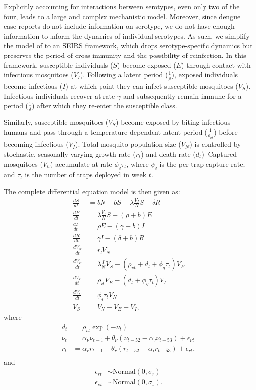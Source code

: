 \documentclass[10pt,letterpaper]{article}
\begin{document}
Explicitly accounting for interactions between serotypes, even only two of the four, leads to a large and complex mechanistic model.
Moreover, since dengue case reports do not include information on serotype, we do not have enough information to inform the dynamics of individual serotypes.
As such, we simplify the model of \cite{Wearing2006} to an SEIRS framework, which drops serotype-specific dynamics but preserves the period of cross-immunity and the possibility of reinfection.
In this framework, susceptible individuals ($S$) become exposed ($E$) through contact with infectious mosquitoes ($V_I$).
Following a latent period ($\frac{1}{\rho}$), exposed individuals become infectious ($I$) at which point they can infect susceptible mosquitoes ($V_S$).
Infectious individuals recover at rate $\gamma$ and subsequently remain immune for a period ($\frac{1}{\delta}$) after which they re-enter the susceptible class.

Similarly, susceptible mosquitoes ($V_S$) become exposed by biting infectious humans and pass through a temperature-dependent latent period ($\frac{1}{\rho_{vt}}$) before becoming infectious ($V_I$).
Total mosquito population size ($V_N$) is controlled by stochastic, seasonally varying growth rate ($r_t$) and death rate ($d_t$).
Captured mosquitoes ($V_C$) accumulate at rate $\phi_q \tau_t$, where $\phi_q$ is the per-trap capture rate, and $\tau_t$ is the number of traps deployed in week $t$.

The complete differential equation model is then given as:
\begin{align} 
\frac{dS}{dt} &= bN - bS - \lambda \frac{V_{I}}{N} S + \delta R\\
\frac{dE}{dt} &= \lambda \frac{V_{I}}{N} S - (\rho + b)E\\
\frac{dI}{dt} &= \rho E - (\gamma + b)I\\
\frac{dR}{dt} &= \gamma I - (\delta + b)R\\
\frac{dV_N}{dt} & = r_t V_N \\
\frac{dV_E}{dt} &= \lambda \frac{I}{N} V_S - (\rho_{vt} + d_t + \phi_q \tau_t)V_E\\
\frac{dV_I}{dt} &= \rho_{vt} V_E - (d_t + \phi_q \tau_t) V_I\\
\frac{dV_C}{dt} & = \phi_q \tau_t V_N\\
V_S &= V_N - V_E - V_I,
\end{align}
where
\begin{align}
d_t & = \rho_{vt} \exp(-\nu_t)\\
\nu_{t} & = \alpha_{\nu} \nu_{t-1} + \theta_{\nu} (\nu_{t-52} - \alpha_{\nu} \nu_{t-53}) +\epsilon_{\nu t}\\
r_t &= \alpha_r r_{t-1} + \theta_r (r_{t-52} - \alpha_r r_{t-53}) + \epsilon_{rt},\\
\end{align}
and
\begin{align}
\epsilon_{rt} & \sim \text{Normal}(0, \sigma_r)\\
\epsilon_{\nu t} & \sim \text{Normal}(0, \sigma_{\nu}).
\end{align}
\end{document}
